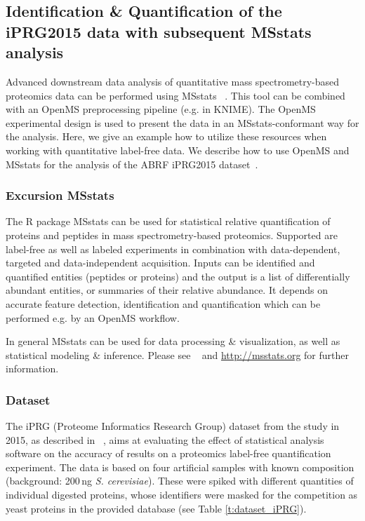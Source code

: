 \subsection{Identification \& Quantification of the iPRG2015 data with subsequent MSstats analysis}
Advanced downstream data analysis of quantitative mass spectrometry-based proteomics data can be performed using MSstats ~\cite{Choi2014MSstats}. This tool can be combined with an OpenMS preprocessing pipeline (e.g. in KNIME). The OpenMS experimental design is used to present the data in an MSstats-conformant way for the analysis. Here, we give an example how to utilize these resources when working with quantitative label-free data. We describe how to use OpenMS and MSstats for the analysis of the ABRF iPRG2015 dataset~\cite{Choi2017iPRG}.



\subsubsection{Excursion MSstats}
The R package MSstats can be used for statistical relative quantification of proteins and peptides in mass spectrometry-based proteomics. Supported are label-free as well as labeled experiments in combination with data-dependent, targeted and data-independent acquisition. Inputs can be identified and quantified entities (peptides or proteins) and the output is a list of differentially abundant entities, or summaries of their relative abundance. It depends on accurate feature detection, identification and quantification which can be performed e.g. by an OpenMS workflow. 

\noindent In general MSstats can be used for data processing \& visualization, as well as statistical modeling \& inference. Please see ~\cite{Choi2014MSstats} and \url{http://msstats.org} for further information.

\subsubsection{Dataset}
The iPRG (Proteome Informatics Research Group) dataset from the study in 2015, as described in ~\cite{Choi2017iPRG}, aims at evaluating the effect of statistical analysis software on the accuracy of results on a proteomics label-free quantification experiment. The data is based on four artificial samples with known composition (background: 200\,ng \emph{S. cerevisiae}). These were spiked with different quantities of individual digested proteins, whose identifiers were masked for the competition as yeast proteins in the provided database (see Table \ref{t:dataset_iPRG}).

